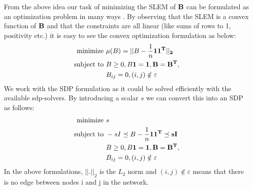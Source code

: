 \documentclass{article}
\begin{document}
From the above idea our task of minimizing the SLEM of $\bf B$ can be formulated as an optimization problem in many ways \cite{Boyd03fastestmixing}. By observing that the SLEM is a convex function of $\bf B$ and that the constraints are all linear (like sums of rows to 1, positivity etc.) it is easy to see the convex optimization formulation as below:
\begin{align}
\text{minimize }& \mu(B) = || B-\frac{1}{n} \bf 1 \bf 1^T ||_2 \nonumber \\
\text{subject to }& B \geq 0, B \bf {1} = \bf {1}, B = B^T, \nonumber \\
& B_{ij} = 0, (i,j) \notin \varepsilon 
\end{align} 
We work with the SDP formulation as it could be solved efficiently with the available sdp-solvers. By introducing a scalar $s$ we can convert this into an SDP as follows:
\begin{align}
\text{minimize }& s \nonumber \\
\text{subject to }& -s I \preceq B-\frac{1}{n} \bf 1 \bf 1^T \preceq s I \nonumber \\
&B \geq 0, B \bf {1} = \bf {1}, B = B^T, \nonumber \\
& B_{ij} = 0, (i,j) \notin \varepsilon 
\end{align} 
In the above formulations, $||.||_2$ is the $L_2$ norm and $(i,j) \notin \varepsilon$ means that there is no edge between nodes i and j in the network.
\end{document}
